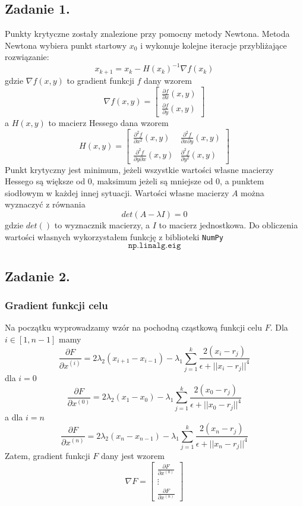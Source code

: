 \documentclass[11pt, leqno]{scrartcl}
\begin{document}
    \subsection{Zadanie 1.}
    Punkty krytyczne zostały znalezione przy pomocny metody Newtona.
    Metoda Newtona wybiera punkt startowy $x_0$ i wykonuje kolejne
    iteracje przybliżające rozwiązanie:
    \[
        x_{k+1}=x_k-H(x_k)^{-1}\nabla f(x_k)
    \]
    gdzie $\nabla f(x,y)$ to gradient funkcji $f$ dany wzorem
    \[
        \nabla f(x,y)=
        \begin{bmatrix}
            \frac{\partial f}{\partial x}(x,y) \\
            \frac{\partial f}{\partial y}(x,y)
        \end{bmatrix}
    \]
    a $H(x,y)$ to macierz Hessego dana wzorem
    \[
        H(x,y)=
        \begin{bmatrix}
            \frac{\partial ^2f}{\partial x^2}(x,y) &
                \frac{\partial ^2f}{\partial x\partial y}(x,y) \\
            \frac{\partial ^2f}{\partial y\partial x}(x,y) &
            \frac{\partial ^2f}{\partial y^2}(x,y)
        \end{bmatrix}
    \]
    Punkt krytyczny jest minimum, jeżeli wszystkie wartości własne
    macierzy Hessego są większe od 0, maksimum jeżeli są mniejsze od
    0, a punktem siodłowym w każdej innej sytuacji. Wartości własne
    macierzy $A$ można wyznaczyć z równania
    \[
        det(A-\lambda I)=0
    \]
    gdzie $det()$ to wyznacznik macierzy, a $I$ to macierz
    jednostkowa. Do obliczenia wartości własnych wykorzystałem
    funkcję z biblioteki \texttt{NumPy}
    \[
        \texttt{np.linalg.eig}
    \]

    \subsection{Zadanie 2.}
    \subsubsection{Gradient funkcji celu}
    Na początku wyprowadzamy wzór na pochodną cząstkową funkcji
    celu $F$. Dla $i \in [1,n-1]$ mamy
    \[
        \frac{\partial F}{\partial x^{(i)}}=2\lambda _2
            (x_{i+1}-x_{i-1})-\lambda _1\sum_{j=1}^{k}
            \frac{2(x_i-r_j)}{\epsilon +||x_i-r_j||^4}
    \]
    dla $i = 0$
    \[
        \frac{\partial F}{\partial x^{(0)}}=2\lambda _2
            (x_{1}-x_{0})-\lambda _1\sum_{j=1}^{k}
            \frac{2(x_0-r_j)}{\epsilon +||x_0-r_j||^4}
    \]
    a dla $i = n$
    \[
        \frac{\partial F}{\partial x^{(n)}}=2\lambda _2
            (x_{n}-x_{n-1})-\lambda _1\sum_{j=1}^{k}
            \frac{2(x_n-r_j)}{\epsilon +||x_n-r_j||^4}
    \]
    Zatem, gradient funkcji $F$ dany jest wzorem
    \[
        \nabla F=
        \begin{bmatrix}
            \frac{\partial F}{\partial x^{(0)}} \\
            \vdots \\
            \frac{\partial F}{\partial x^{(n)}}
        \end{bmatrix}
    \]
\end{document}
